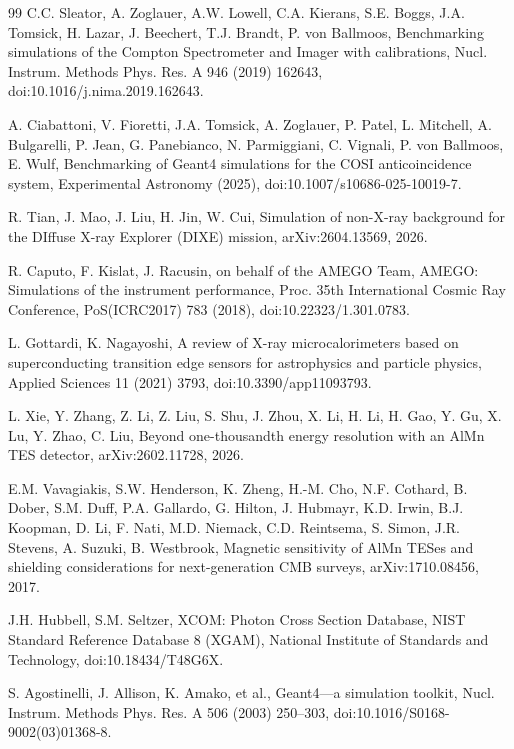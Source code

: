 \documentclass[11pt]{article}
\begin{document}
\begin{thebibliography}{99}
C.C. Sleator, A. Zoglauer, A.W. Lowell, C.A. Kierans, S.E. Boggs, J.A. Tomsick, H. Lazar, J. Beechert, T.J. Brandt, P. von Ballmoos, Benchmarking simulations of the Compton Spectrometer and Imager with calibrations, Nucl. Instrum. Methods Phys. Res. A 946 (2019) 162643, doi:10.1016/j.nima.2019.162643.

A. Ciabattoni, V. Fioretti, J.A. Tomsick, A. Zoglauer, P. Patel, L. Mitchell, A. Bulgarelli, P. Jean, G. Panebianco, N. Parmiggiani, C. Vignali, P. von Ballmoos, E. Wulf, Benchmarking of Geant4 simulations for the COSI anticoincidence system, Experimental Astronomy (2025), doi:10.1007/s10686-025-10019-7.

R. Tian, J. Mao, J. Liu, H. Jin, W. Cui, Simulation of non-X-ray background for the DIffuse X-ray Explorer (DIXE) mission, arXiv:2604.13569, 2026.

R. Caputo, F. Kislat, J. Racusin, on behalf of the AMEGO Team, AMEGO: Simulations of the instrument performance, Proc. 35th International Cosmic Ray Conference, PoS(ICRC2017) 783 (2018), doi:10.22323/1.301.0783.

L. Gottardi, K. Nagayoshi, A review of X-ray microcalorimeters based on superconducting transition edge sensors for astrophysics and particle physics, Applied Sciences 11 (2021) 3793, doi:10.3390/app11093793.

L. Xie, Y. Zhang, Z. Li, Z. Liu, S. Shu, J. Zhou, X. Li, H. Li, H. Gao, Y. Gu, X. Lu, Y. Zhao, C. Liu, Beyond one-thousandth energy resolution with an AlMn TES detector, arXiv:2602.11728, 2026.

E.M. Vavagiakis, S.W. Henderson, K. Zheng, H.-M. Cho, N.F. Cothard, B. Dober, S.M. Duff, P.A. Gallardo, G. Hilton, J. Hubmayr, K.D. Irwin, B.J. Koopman, D. Li, F. Nati, M.D. Niemack, C.D. Reintsema, S. Simon, J.R. Stevens, A. Suzuki, B. Westbrook, Magnetic sensitivity of AlMn TESes and shielding considerations for next-generation CMB surveys, arXiv:1710.08456, 2017.

J.H. Hubbell, S.M. Seltzer, XCOM: Photon Cross Section Database, NIST Standard Reference Database 8 (XGAM), National Institute of Standards and Technology, doi:10.18434/T48G6X.

S. Agostinelli, J. Allison, K. Amako, et al., Geant4---a simulation toolkit, Nucl. Instrum. Methods Phys. Res. A 506 (2003) 250--303, doi:10.1016/S0168-9002(03)01368-8.


\end{thebibliography}
\end{document}
